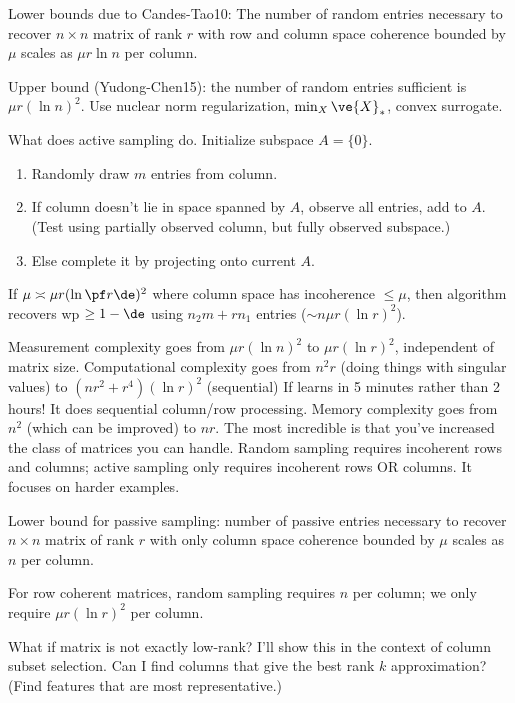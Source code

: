Lower bounds due to Candes-Tao10: The number of random entries necessary to recover $n\times n$ matrix of rank $r$ with row and column space coherence bounded by $\mu$ scales as $\mu r\ln n$ per column.

Upper bound (Yudong-Chen15): the number of random entries sufficient is $\mu r(\ln n)^2$. Use nuclear norm regularization, $\min_X \ve{X}_*$, convex surrogate.

What does active sampling do. Initialize subspace $A=\{0\}$.
\begin{enumerate}
\item
Randomly draw $m$ entries from column.
\item
If column doesn't lie in space spanned by $A$, observe all entries, add to $A$. (Test using partially observed column, but fully observed subspace.)
\item
Else complete it by projecting onto current $A$.
\end{enumerate}
If $\mu \asymp \mu r (\ln \pf r\de)^2$ where column space has incoherence $\le \mu$, then algorithm recovers wp $\ge 1-\de$ using $n_2m+rn_1$ entries ($\sim n\mu r(\ln r)^2$). %

Measurement complexity goes from $\mu r(\ln n)^2$ to $\mu r(\ln r)^2$, independent of matrix size.
Computational complexity goes from $n^2r$ (doing things with singular values) to $(nr^2+r^4)(\ln r)^2$ (sequential)
If learns in 5 minutes rather than 2 hours!
It does sequential column/row processing. Memory complexity goes from $n^2$ (which can be improved) to $nr$. The most incredible is that you've increased the class of matrices you can handle. Random sampling requires incoherent rows and columns; active sampling only requires incoherent rows OR columns. It focuses on harder examples.


Lower bound for passive sampling: number of passive entries necessary to recover $n\times n$ matrix of rank $r$ with only column space coherence bounded by $\mu$ scales as $n$ per column.

For row coherent matrices, random sampling requires $n$ per column; we only require $\mu r(\ln r)^2$ per column.

What if matrix is not exactly low-rank? %
I'll show this in the context of column subset selection. Can I find columns that give the best rank $k$ approximation? (Find features that are most representative.)

